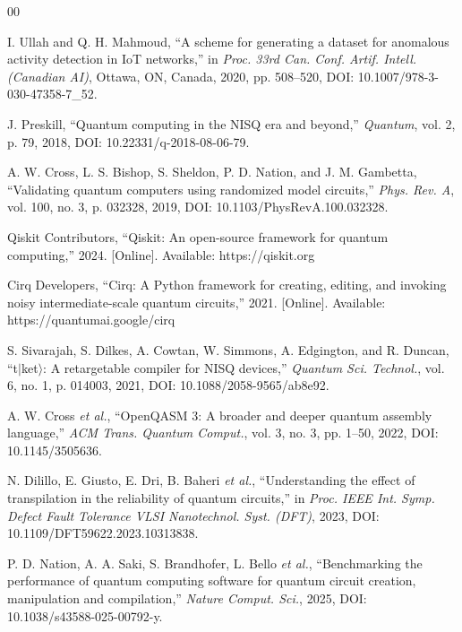 \documentclass{ieeeaccess}
\begin{document}
\begin{thebibliography}{00}

 I. Ullah and Q. H. Mahmoud, ``A scheme for generating a dataset for anomalous activity detection in IoT networks,'' in \emph{Proc. 33rd Can. Conf. Artif. Intell. (Canadian AI)}, Ottawa, ON, Canada, 2020, pp. 508--520, DOI: 10.1007/978-3-030-47358-7\_52.

 J. Preskill, ``Quantum computing in the NISQ era and beyond,'' \emph{Quantum}, vol. 2, p. 79, 2018, DOI: 10.22331/q-2018-08-06-79.

 A. W. Cross, L. S. Bishop, S. Sheldon, P. D. Nation, and J. M. Gambetta, ``Validating quantum computers using randomized model circuits,'' \emph{Phys. Rev. A}, vol. 100, no. 3, p. 032328, 2019, DOI: 10.1103/PhysRevA.100.032328.

 {Qiskit Contributors}, ``Qiskit: An open-source framework for quantum computing,'' 2024. [Online]. Available: https://qiskit.org

 {Cirq Developers}, ``Cirq: A Python framework for creating, editing, and invoking noisy intermediate-scale quantum circuits,'' 2021. [Online]. Available: https://quantumai.google/cirq

 S. Sivarajah, S. Dilkes, A. Cowtan, W. Simmons, A. Edgington, and R. Duncan, ``t$|$ket$\rangle$: A retargetable compiler for NISQ devices,'' \emph{Quantum Sci. Technol.}, vol. 6, no. 1, p. 014003, 2021, DOI: 10.1088/2058-9565/ab8e92.

 A. W. Cross \emph{et al.}, ``OpenQASM 3: A broader and deeper quantum assembly language,'' \emph{ACM Trans. Quantum Comput.}, vol. 3, no. 3, pp. 1--50, 2022, DOI: 10.1145/3505636.

 N. Dilillo, E. Giusto, E. Dri, B. Baheri \emph{et al.}, ``Understanding the effect of transpilation in the reliability of quantum circuits,'' in \emph{Proc. IEEE Int. Symp. Defect Fault Tolerance VLSI Nanotechnol. Syst. (DFT)}, 2023, DOI: 10.1109/DFT59622.2023.10313838.

 P. D. Nation, A. A. Saki, S. Brandhofer, L. Bello \emph{et al.}, ``Benchmarking the performance of quantum computing software for quantum circuit creation, manipulation and compilation,'' \emph{Nature Comput. Sci.}, 2025, DOI: 10.1038/s43588-025-00792-y.


\end{thebibliography}
\end{document}
